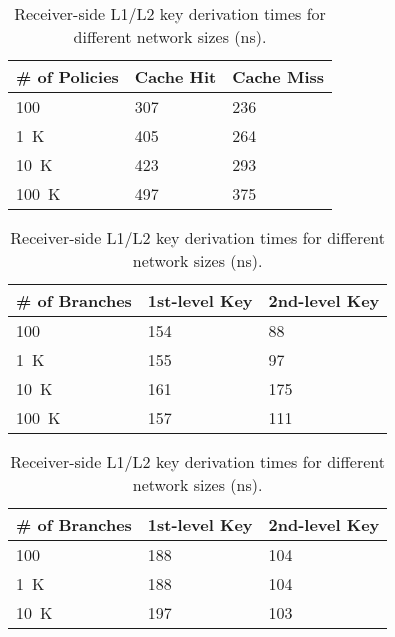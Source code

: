 \begin{table}[htb]%
	\begin{minipage}{.47\linewidth}
		\caption{Benchmark results for the transfer policy lookup (ns).}
		\label{tab:authorization}
		\begin{tabularx}{1\linewidth}{X|XX}
			\toprule
			\# of Policies & Cache Hit & Cache Miss \\
			\midrule
			100            & 307       & 236        \\
			\SI{1}{K}      & 405       & 264        \\
			\SI{10}{K}     & 423       & 293        \\
			\SI{100}{K}    & 497       & 375        \\
			\bottomrule
		\end{tabularx}
	\end{minipage}\hspace{2em}
	\begin{minipage}{.47\linewidth}
		\caption{Sender-side L1 key lookup and L2 key derivation times for different network sizes (ns).}
		\label{tab:derivation_send}
		\begin{tabularx}{1\linewidth}{X|XX}
			\toprule
			\# of Branches & 1st-level Key & 2nd-level Key \\
			\midrule
			100            & 154           & 88            \\	%
			\SI{1}{K}      & 155           & 97            \\	%
			\SI{10}{K}     & 161           & 175           \\	%
			\SI{100}{K}    & 157           & 111           \\	%
			\bottomrule
		\end{tabularx}
	\end{minipage}\vspace{2em}
	\begin{minipage}{.47\linewidth}
		\caption{Receiver-side L1/L2 key derivation times for different network sizes (ns).}
		\label{tab:derivation_rec}
		\begin{tabularx}{1\linewidth}{X|XX}
			\toprule
			\# of Branches & 1st-level Key & 2nd-level Key \\
			\midrule
			100            & 188           & 104           \\	%
			\SI{1}{K}      & 188           & 104           \\	%
			\SI{10}{K}     & 197           & 103           \\	%

\end{tabularx}
\end{minipage}
\end{table}
